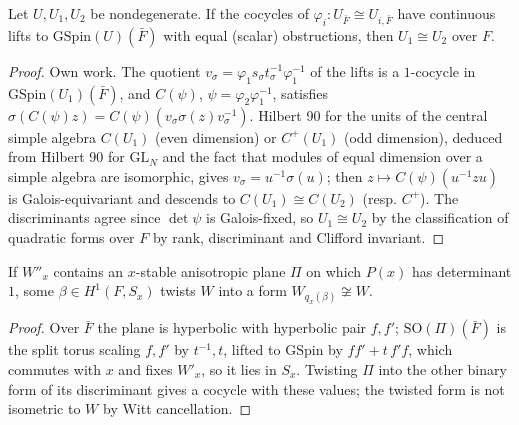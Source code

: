 \begin{lemma}
\label{nonempty_isometryEquiv_of_galObstruction_eq}
\leanok
{}
Let $U,U_1,U_2$ be nondegenerate. If the cocycles of $\varphi_i\colon U_{\bar F}\cong U_{i,\bar F}$ have continuous lifts to
$\mathrm{GSpin}(U)(\bar F)$ with equal (scalar) obstructions, then $U_1\cong U_2$ over $F$.
\end{lemma}
\begin{proof}
\leanok
{}
Own work. The quotient $v_\sigma=\varphi_1 s_\sigma t_\sigma^{-1}\varphi_1^{-1}$ of the lifts is a $1$-cocycle in
$\mathrm{GSpin}(U_1)(\bar F)$, and $C(\psi)$, $\psi=\varphi_2\varphi_1^{-1}$, satisfies $\sigma(C(\psi)z)=C(\psi)(v_\sigma\sigma(z)v_\sigma^{-1})$.
Hilbert 90 for the units of the central simple algebra $C(U_1)$ (even dimension) or $C^+(U_1)$ (odd dimension), deduced from
Hilbert 90 for $\mathrm{GL}_N$ and the fact that modules of equal dimension over a simple algebra are isomorphic, gives
$v_\sigma=u^{-1}\sigma(u)$; then $z\mapsto C(\psi)(u^{-1}zu)$ is Galois-equivariant and descends to $C(U_1)\cong C(U_2)$ (resp.
$C^+$). The discriminants agree since $\det\psi$ is Galois-fixed, so $U_1\cong U_2$ by the classification of quadratic forms over
$F$ by rank, discriminant and Clifford invariant.
\end{proof}

\begin{lemma}
\label{exists_twistIdx_not_isometric_of_hasTwistPlane}
\leanok
{}
If $W''_x$ contains an $x$-stable anisotropic plane $\Pi$ on which $P(x)$ has determinant $1$, some $\beta\in H^1(F,S_x)$
twists $W$ into a form $W_{q_x(\beta)}\not\cong W$.
\end{lemma}
\begin{proof}
\leanok
{}
Over $\bar F$ the plane is hyperbolic with hyperbolic pair $f,f'$; $\mathrm{SO}(\Pi)(\bar F)$ is the split torus scaling $f,f'$
by $t^{-1},t$, lifted to $\mathrm{GSpin}$ by $ff'+t\,f'f$, which commutes with $x$ and fixes $W'_x$, so it lies in $S_x$.
Twisting $\Pi$ into the other binary form of its discriminant gives a cocycle with these values; the twisted form is
not isometric to $W$ by Witt cancellation.
\end{proof}

